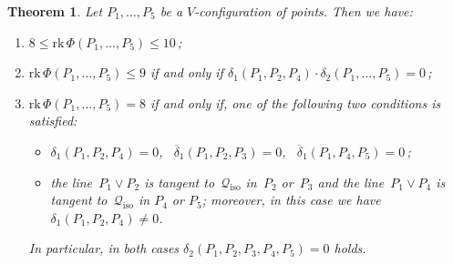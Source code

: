 \documentclass[a4paper, 11pt, reqno]{amsart}
\theoremstyle{plain}
\newtheorem{theorem}[lemma]{Theorem}
\theoremstyle{definition}
\newcommand{\rk}{\ensuremath{\mathrm{rk}}}
\newcommand{\iso}{\mathcal{Q}_{\mathrm{iso}}}
\begin{document}
\begin{theorem}
\label{theorem:rank_V}
Let $P_1, \dots, P_5$ be a $V$-configuration of
points. Then we have:
%
\begin{enumerate}
  \item $8 \leq \rk \,\Phi(P_1, \dots, P_5) \leq 10$\,;
  \item $\rk \,\Phi(P_1, \dots, P_5) \leq 9$ if and only if
  $\delta_1(P_1, P_2, P_4) \cdot \delta_2(P_1, \dots, P_5) =0$\,;
  \item $\rk \,\Phi(P_1, \dots, P_5) = 8$ if and only if, one of
  the following two conditions is satisfied:
  \begin{itemize}
    \item $\delta_1(P_1, P_2, P_4) = 0$, \
    $\overline{\delta}_1(P_1, P_2, P_3) = 0$, \ 
    $\overline{\delta}_1(P_1, P_4, P_5) = 0$\,;
    \item the line~$P_1 \vee P_2$ is tangent to~$\iso$ in~$P_2$ or~$P_3$
    and the line~$P_1 \vee P_4$ is tangent to~$\iso$ in $P_4$ or $P_5$; 
    moreover, in this case we have $\delta_1(P_1, P_2, P_4) \neq 0$.
  \end{itemize}
  In particular, in both cases $\delta_2(P_1, P_2, P_3, P_4, P_5) = 0$ holds.
\end{enumerate}
%
\end{theorem}
\end{document}
